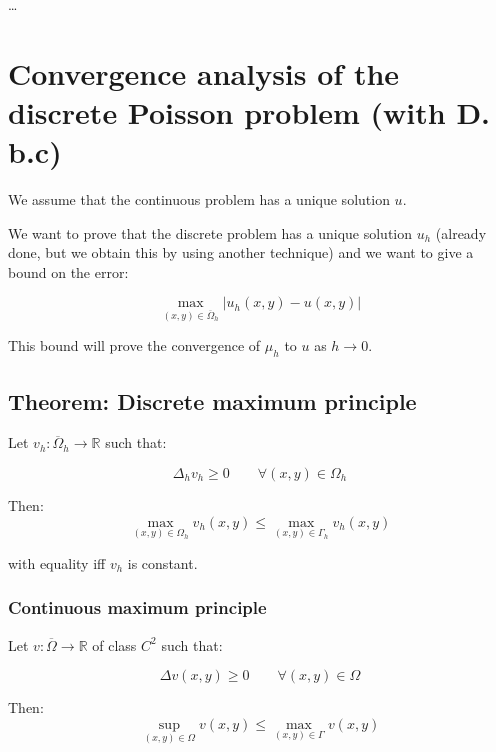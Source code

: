 \dots

\section{Convergence analysis of the discrete Poisson problem (with D. b.c)}

We assume that the continuous problem has a unique solution $u$.

We want to prove that the discrete problem has a unique solution $u_h$ (already done, but we obtain this by using another technique) and we want to give a bound on the error:

\begin{equation*}
\max_{(x,y) \in \overline{\Omega}_h} |u_h (x, y) - u(x, y)|
\end{equation*}

This bound will prove the convergence of $\mu_h$ to $u$ as $h \rightarrow 0$.


\subsection{Theorem: Discrete maximum principle}

Let $v_h: \overline{\Omega}_h \rightarrow \mathbb{R}$ such that:

\begin{equation*}
\Delta_h v_h \ge 0 \qquad \forall (x, y) \in \Omega_h
\end{equation*}

Then:
\begin{equation*}
\max_{(x,y) \in \Omega_h} v_h (x, y) \le \max_{(x,y) \in \Gamma_h} v_h (x, y)
\end{equation*}

with equality iff $v_h$ is constant.

\subsubsection{Continuous maximum principle}

Let $v: \overline{\Omega} \rightarrow \mathbb{R}$ of class $C^2$ such that:

\begin{equation*}
\Delta v (x,y) \ge 0 \qquad \forall (x, y) \in \Omega
\end{equation*}

Then:
\begin{equation*}
\sup_{(x,y) \in \Omega} v(x, y) \le \max_{(x,y) \in \Gamma} v(x, y)
\end{equation*}


